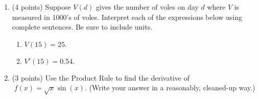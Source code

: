 \documentclass[12pt]{article}
\begin{document}
\begin{enumerate}
\begin{tabularx}{\textwidth}{XXX}
\end{tabularx}

\item (4 points) Suppose  $V(d)$ gives the number of voles on day $d$ where $V$ is measured in 1000's of voles. Interpret each of the expressions below using complete sentences. Be sure to include units.
	\begin{enumerate}
	\item $V(15) =25.$
\vfill
	\item $V'(15)=0.54.$
\vfill
	\end{enumerate}
\item (3 points) Use the Product Rule to find the derivative of $\; f(x)=\sqrt{x}\sin(x).$ (Write your answer in a reasonably, cleaned-up way.)
\vfill

\end{enumerate}
\end{document}
